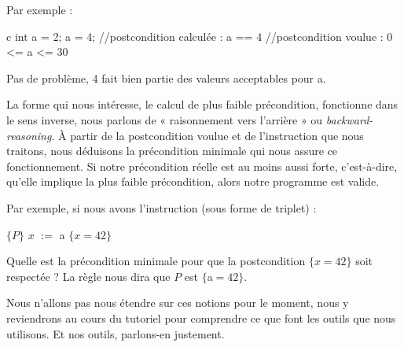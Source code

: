 Par exemple :

\begin{CodeBlock}{c}
int a = 2;
a = 4;
//postcondition calculée : a == 4
//postcondition voulue   : 0 <= a <= 30
\end{CodeBlock}



Pas de problème, 4 fait bien partie des valeurs acceptables pour a.



La forme qui nous intéresse, le calcul de plus faible précondition, fonctionne
dans le sens inverse, nous parlons de « raisonnement vers l'arrière » ou
\textit{backward-reasoning}. À partir de la postcondition voulue et de
l'instruction que nous traitons, nous déduisons la précondition minimale
qui nous assure ce fonctionnement. Si notre précondition réelle est au moins
aussi forte, c'est-à-dire, qu'elle implique la plus faible précondition, alors
notre programme est valide.



Par exemple, si nous avons l'instruction (sous forme de triplet) :



$\{P\}$ $x$ $:=$ a $\{x = 42\}$



Quelle est la précondition minimale pour que la postcondition $\{x = 42\}$
soit respectée ? La règle nous dira que $P$ est $\{$a$=42\}$.



Nous n'allons pas nous étendre sur ces notions pour le moment, nous y
reviendrons au cours du tutoriel pour comprendre ce que font les outils que
nous utilisons. Et nos outils, parlons-en justement.
